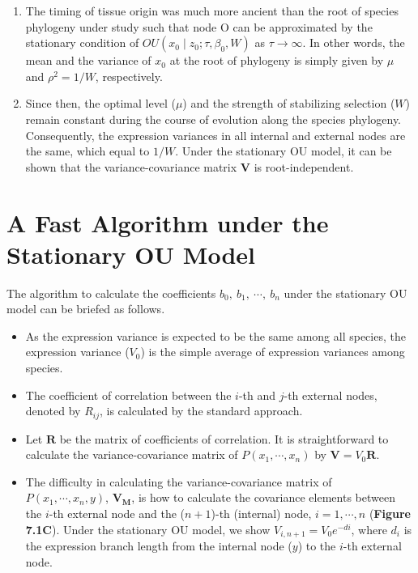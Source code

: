 \documentclass[]{book}
\providecommand{\tightlist}{%
  \setlength{\itemsep}{0pt}\setlength{\parskip}{0pt}}
\begin{document}
\begin{enumerate}
\def\labelenumi{\arabic{enumi}.}
\tightlist
\item
  The timing of tissue origin was much more ancient than the root of species phylogeny under study such that node O can be approximated by the stationary condition of \(OU\left(x_0\mid z_0; \tau,\beta_0, W\right)\) as \(\tau \rightarrow \infty\). In other words, the mean and the variance of \(x_0\) at the root of phylogeny is simply given by \(\mu\) and \(\rho^2 = 1/W\), respectively.
\item
  Since then, the optimal level (\(\mu\)) and the strength of stabilizing selection (\(W\)) remain constant during the course of evolution along the species phylogeny. Consequently, the expression variances in all internal and external nodes are the same, which equal to \(1/W\). Under the stationary OU model, it can be shown that the variance-covariance matrix \(\boldsymbol{V}\) is root-independent\citep{hansen1996}.
\end{enumerate}

\newpage

\hypertarget{a-fast-algorithm-under-the-stationary-ou-model}{%
\section{A Fast Algorithm under the Stationary OU Model}\label{a-fast-algorithm-under-the-stationary-ou-model}}

The algorithm to calculate the coefficients \(b_0,\  b_1,\  \cdots,\  b_n\) under the stationary OU model can be briefed as follows.

\begin{itemize}
\tightlist
\item
  As the expression variance is expected to be the same among all species, the expression variance (\(V_0\)) is the simple average of expression variances among species.
\item
  The coefficient of correlation between the \(i\)-th and \(j\)-th external nodes, denoted by \(R_{ij}\), is calculated by the standard approach.
\item
  Let \(\boldsymbol{R}\) be the matrix of coefficients of correlation. It is straightforward to calculate the variance-covariance matrix of \(P\left(x_1,\cdots,x_n\right)\) by \(\boldsymbol{V}=V_0\boldsymbol{R}\).\\
\item
  The difficulty in calculating the variance-covariance matrix of \(P\left(x_1,\cdots,x_n,y\right)\), \(\boldsymbol{V_M}\), is how to calculate the covariance elements between the \(i\)-th external node and the (\(n+1\))-th (internal) node, \(i=1,\cdots,n\) (\textbf{Figure 7.1C}). Under the stationary OU model, we show \(V_{i,n+1}=V_{0}e^{-di}\), where \(d_i\) is the expression branch length from the internal node (\(y\)) to the \(i\)-th external node.
\end{itemize}
\end{document}
